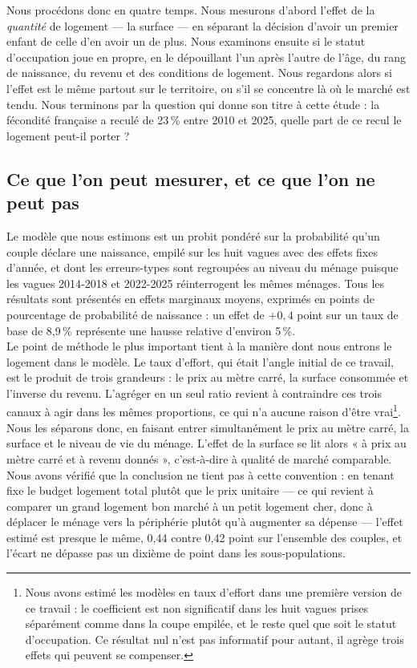 \documentclass[12pt,a4paper]{article}
\begin{document}
\noindent Nous procédons donc en quatre temps. Nous mesurons d'abord l'effet de la \textit{quantité} de logement — la surface — en séparant la décision d'avoir un premier enfant de celle d'en avoir un de plus. Nous examinons ensuite si le statut d'occupation joue en propre, en le dépouillant l'un après l'autre de l'âge, du rang de naissance, du revenu et des conditions de logement. Nous regardons alors si l'effet est le même partout sur le territoire, ou s'il se concentre là où le marché est tendu. Nous terminons par la question qui donne son titre à cette étude : la fécondité française a reculé de 23\,\% entre 2010 et 2025, quelle part de ce recul le logement peut-il porter ?

\subsection{Ce que l'on peut mesurer, et ce que l'on ne peut pas}\label{sec:methode}

Le modèle que nous estimons est un probit pondéré sur la probabilité qu'un couple déclare une naissance, empilé sur les huit vagues avec des effets fixes d'année, et dont les erreurs-types sont regroupées au niveau du ménage puisque les vagues 2014-2018 et 2022-2025 réinterrogent les mêmes ménages. Tous les résultats sont présentés en effets marginaux moyens, exprimés en points de pourcentage de probabilité de naissance : un effet de $+0{,}4$ point sur un taux de base de 8,9\,\% représente une hausse relative d'environ 5\,\%. \\

\noindent Le point de méthode le plus important tient à la manière dont nous entrons le logement dans le modèle. Le taux d'effort, qui était l'angle initial de ce travail, est le produit de trois grandeurs : le prix au mètre carré, la surface consommée et l'inverse du revenu. L'agréger en un seul ratio revient à contraindre ces trois canaux à agir dans les mêmes proportions, ce qui n'a aucune raison d'être vrai\footnote{Nous avons estimé les modèles en taux d'effort dans une première version de ce travail : le coefficient est non significatif dans les huit vagues prises séparément comme dans la coupe empilée, et le reste quel que soit le statut d'occupation. Ce résultat nul n'est pas informatif pour autant, il agrège trois effets qui peuvent se compenser.}. Nous les séparons donc, en faisant entrer simultanément le prix au mètre carré, la surface et le niveau de vie du ménage. L'effet de la surface se lit alors « à prix au mètre carré et à revenu donnés », c'est-à-dire à qualité de marché comparable. Nous avons vérifié que la conclusion ne tient pas à cette convention : en tenant fixe le budget logement total plutôt que le prix unitaire — ce qui revient à comparer un grand logement bon marché à un petit logement cher, donc à déplacer le ménage vers la périphérie plutôt qu'à augmenter sa dépense — l'effet estimé est presque le même, 0,44 contre 0,42 point sur l'ensemble des couples, et l'écart ne dépasse pas un dixième de point dans les sous-populations. \\
\end{document}
